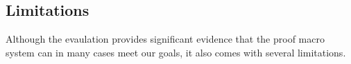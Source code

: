%  
%  
%  
%  
%  
%  

\subsection{Limitations}

Although the evaulation provides significant evidence that the proof macro
system can in many cases meet our goals, it also comes with several limitations.

